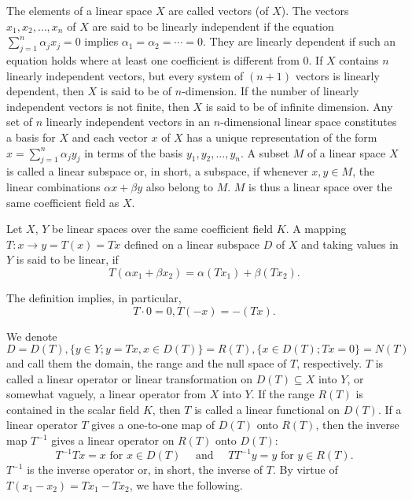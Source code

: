 \begin{definitionu} The elements of a linear space $X$ are called vectors (of $X$). The vectors $x_{1}, x_{2}, \ldots, x_{n}$ of $X$ are said to be linearly independent if the equation $\sum\limits_{j=1}^{n} \alpha_{j} x_{j} = 0$ implies $\alpha_{1} = \alpha_{2} = \cdots = 0$. They are linearly dependent if such an equation holds where at least one coefficient is different from $0$. If $X$ contains $n$ linearly independent vectors, but every system of $(n + 1)$ vectors is linearly dependent, then $X$ is said to be of $n$-dimension. If the number of linearly independent vectors is not finite, then $X$ is said to be of infinite dimension. Any set of $n$ linearly independent vectors in an $n$-dimensional linear space constitutes a basis for $X$ 
and each vector $x$ of $X$ has a unique representation of the form $x = \sum\limits_{j=1}^{n} \alpha_j y_j$ in terms of the basis $y_1, y_2, \ldots, y_n$. A subset $M$ of a linear space $X$ is called a linear subspace or, in short, a subspace, if whenever $x, y \in M$, the linear combinations $\alpha x + \beta y$ also belong to $M$. $M$ is thus a linear space over the same coefficient field as $X$. 
\end{definitionu}


\begin{definitionu} Let $X$, $Y$ be linear spaces over the same coefficient field $K$. A mapping $T: x \to y = T(x) = Tx$ defined on a linear subspace $D$ of $X$ and taking values in $Y$ is said to be linear, if 
\[
T \left(\alpha x _{1} + \beta x _{2}\right) = \alpha \left(T x _{1}\right) + \beta \left(T x _{2}\right).
\]
\end{definitionu}

The definition implies, in particular, 
\[
T \cdot 0 = 0, T (- x) =- (T x).
\]

We denote 
\[
D = D (T), \{y \in Y; y = T x, x \in D (T) \} = R (T), \{x \in D (T); T x = 0 \} = N (T)
\]
and call them the domain, the range and the null space of $T$, respectively. $T$ is called a linear operator or linear transformation on $D(T) \subseteq X$ into $Y$, or somewhat vaguely, a linear operator from $X$ into $Y$. If the range $R(T)$ is contained in the scalar field $K$, then $T$ is called a linear functional on $D(T)$. If a linear operator $T$ gives a one-to-one map of $D(T)$ onto $R(T)$, then the inverse map $T^{-1}$ gives a linear operator on $R(T)$ onto $D(T)$: 
\[
T ^{-1} T x = x \text{ for } x \in D (T) \quad \text{ and } \quad T T ^{-1} y = y \text{ for } y \in R (T).
\]
$T^{-1}$ is the inverse operator or, in short, the inverse of $T$. By virtue of $T(x_{1}- x_{2}) = Tx_{1}- Tx_{2}$, we have the following. 

